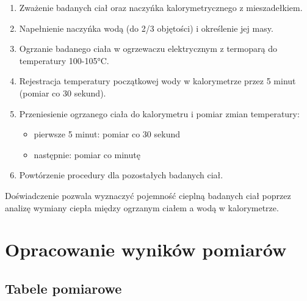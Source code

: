 \documentclass[a4paper,12pt]{article}
\begin{document}
\begin{enumerate}
    \item Zważenie badanych ciał oraz naczyńka kalorymetrycznego z mieszadełkiem.
    \item Napełnienie naczyńka wodą (do 2/3 objętości) i określenie jej masy.
    \item Ogrzanie badanego ciała w ogrzewaczu elektrycznym z termoparą do temperatury 100-105°C.
    \item Rejestracja temperatury początkowej wody w kalorymetrze przez 5 minut (pomiar co 30 sekund).
    \item Przeniesienie ogrzanego ciała do kalorymetru i pomiar zmian temperatury:
          \begin{itemize}
              \item pierwsze 5 minut: pomiar co 30 sekund
              \item następnie: pomiar co minutę
          \end{itemize}
    \item Powtórzenie procedury dla pozostałych badanych ciał.
\end{enumerate}

Doświadczenie pozwala wyznaczyć pojemność cieplną badanych ciał poprzez analizę wymiany ciepła między ogrzanym ciałem a wodą w kalorymetrze.


\section{Opracowanie wyników pomiarów}

\subsection{Tabele pomiarowe}
\end{document}
